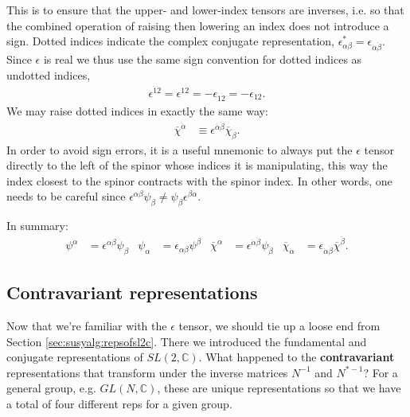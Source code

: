 \documentclass[12pt, oneside]{report}    %
\begin{document}
This is to ensure that the upper- and lower-index tensors are inverses, i.e. so that the combined operation of raising then lowering an index does not introduce a sign.
%
Dotted indices indicate the complex conjugate representation, $\epsilon_{\alpha\beta}^{*} = \epsilon_{\dot\alpha\dot\beta}$. Since $\epsilon$ is real we thus use the same sign convention for dotted indices as undotted indices,
\begin{align}
    \epsilon^{\dot 1 \dot 2} = \epsilon^{12} = - \epsilon_{\dot 1 \dot 2} = - \epsilon_{12}.
\end{align}
%
We may raise dotted indices in exactly the same way:
\begin{align}
    \overline\chi^{\dot\alpha} &\equiv \epsilon^{\dot \alpha \dot \beta}\overline\chi_{\dot\beta}.
\end{align}
In order to avoid sign errors, it is a useful mnemonic to always put the $\epsilon$ tensor directly to the left of the spinor whose indices it is manipulating, this way the index closest to the spinor contracts with the spinor index. In other words, one needs to be careful since  $\epsilon^{\alpha\beta}\psi_\beta \neq \psi_\beta\epsilon^{\beta\alpha}$.
%

In summary:
\begin{align}
    \psi^\alpha &= \epsilon^{\alpha\beta}\psi_\beta & \psi_\alpha &= \epsilon_{\alpha\beta}\psi^\beta & \overline\chi^\alpha &= \epsilon^{\dot\alpha\dot\beta}\psi_{\dot\beta} & \overline\chi_{\dot\alpha} &= \epsilon_{\dot\alpha\dot\beta}\overline\chi^{\dot\beta}.
\end{align}


\subsection{Contravariant representations}
Now that we're familiar with the $\epsilon$ tensor, we should tie up a loose end from Section \ref{sec:susyalg:repsofsl2c}. There we introduced the fundamental and conjugate representations of $SL(2,\mathbb{C})$. What happened to the \textbf{contravariant} representations that transform under the inverse matrices $N^{-1}$ and $N^{*-1}$? For a general group, e.g. $GL(N,\mathbb{C})$, these are unique representations so that we have a total of four different reps for a given group.
%
\end{document}
